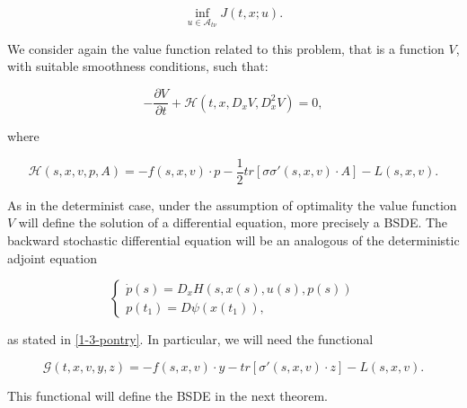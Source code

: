 \[\inf_{u\in\mathcal{A}_{t\nu}} J(t,x;u).\]

We consider again the value function related to this problem, that is a function $V$, with suitable smoothness conditions, such that:

\begin{equation}
    -\frac{\partial V}{\partial t} + \mathcal{H}(t,x,D_xV,D_x^2V) = 0,
\end{equation}

where

\begin{equation}
    \mathcal{H}(s,x,v,p,A) = - f(s,x,v)\cdot p - \frac{1}{2}tr\left[\sigma\sigma'(s,x,v)\cdot A\right] - L(s,x,v).
\end{equation}

As in the determinist case, under the assumption of optimality the value function $V$ will define the solution 
of a differential equation, more precisely a BSDE. The backward stochastic differential equation will be an 
analogous of the deterministic adjoint equation

\[\begin{cases}
    \dot{p}(s) = D_xH(s,x(s),u(s),p(s)) \\
    p(t_1) = D\psi(x(t_1)),
\end{cases}\]

as stated in \eqref{1-3-pontry}. In particular, we will need the functional

\begin{equation}\label{3-2-defG}\mathcal{G}(t,x,v,y,z) = -f(s,x,v)\cdot y - tr\left[\sigma'(s,x,v)\cdot z\right] - L(s,x,v).\end{equation}

This functional will define the BSDE in the next theorem.

